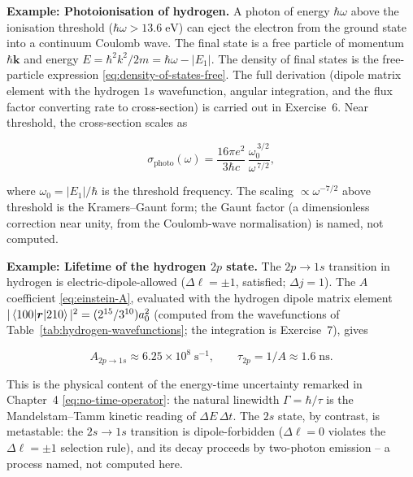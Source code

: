 \medskip\noindent\textbf{Example: Photoionisation of hydrogen.}
A photon of energy $\hbar\omega$ above the ionisation threshold ($\hbar\omega > 13.6\;\text{eV}$) can eject the electron from the ground state into a continuum Coulomb wave. The final state is a free particle of momentum $\hbar\bm k$ and energy $E = \hbar^{2}k^{2}/2m = \hbar\omega - |E_{1}|$. The density of final states is the free-particle expression \eqref{eq:density-of-states-free}. The full derivation (dipole matrix element with the hydrogen $1s$ wavefunction, angular integration, and the flux factor converting rate to cross-section) is carried out in Exercise~6. Near threshold, the cross-section scales as
\begin{linenomath}
\begin{equation}
\sigma_{\text{photo}}(\omega) = \frac{16\pi e^{2}}{3\hbar c}\,\frac{\omega_{0}^{\,3/2}}{\omega^{\,7/2}},
\label{eq:photoionization-cross-section}
\end{equation}
\end{linenomath}
where $\omega_{0} = |E_{1}|/\hbar$ is the threshold frequency. The scaling $\propto \omega^{-7/2}$ above threshold is the Kramers--Gaunt form; the Gaunt factor (a dimensionless correction near unity, from the Coulomb-wave normalisation) is named, not computed.

\medskip\noindent\textbf{Example: Lifetime of the hydrogen $2p$ state.}
The $2p \to 1s$ transition in hydrogen is electric-dipole-allowed ($\Delta\ell = \pm1$, satisfied; $\Delta j = 1$). The $A$ coefficient \eqref{eq:einstein-A}, evaluated with the hydrogen dipole matrix element $|\braket{100|\bm r|210}|^{2} = (2^{15}/3^{10})a_{0}^{2}$ (computed from the wavefunctions of Table~\ref{tab:hydrogen-wavefunctions}; the integration is Exercise~7), gives
\begin{linenomath}
\begin{equation*}
A_{2p\to 1s} \approx 6.25 \times 10^{8}\;\text{s}^{-1},
\qquad \tau_{2p} = 1/A \approx 1.6\;\text{ns}.
\end{equation*}
\end{linenomath}
This is the physical content of the energy-time uncertainty remarked in Chapter~4 \eqref{eq:no-time-operator}: the natural linewidth $\Gamma = \hbar/\tau$ is the Mandelstam--Tamm kinetic reading of $\Delta E\,\Delta t$. The $2s$ state, by contrast, is metastable: the $2s \to 1s$ transition is dipole-forbidden ($\Delta\ell=0$ violates the $\Delta\ell=\pm1$ selection rule), and its decay proceeds by two-photon emission -- a process named, not computed here.

